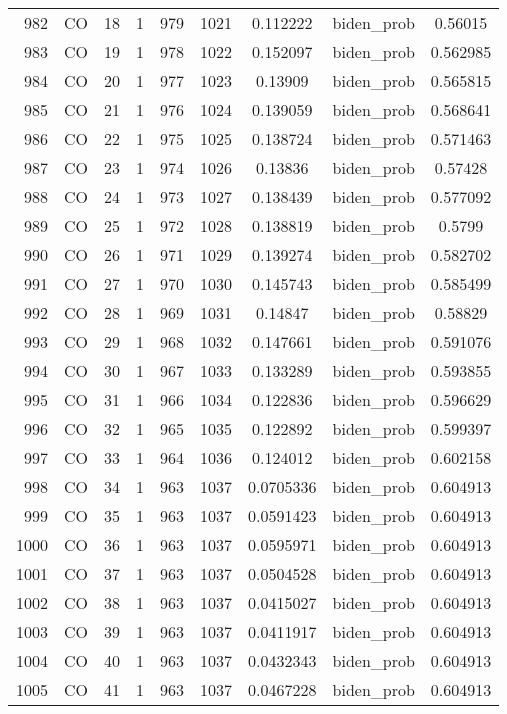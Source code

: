 \documentclass[12pt,a4paper]{article}
\begin{document}
\begin{tabular}{r|cccccccc}
	982 & CO & 18 & 1 & 979 & 1021 & 0.112222 & biden\_prob & 0.56015 \\
	983 & CO & 19 & 1 & 978 & 1022 & 0.152097 & biden\_prob & 0.562985 \\
	984 & CO & 20 & 1 & 977 & 1023 & 0.13909 & biden\_prob & 0.565815 \\
	985 & CO & 21 & 1 & 976 & 1024 & 0.139059 & biden\_prob & 0.568641 \\
	986 & CO & 22 & 1 & 975 & 1025 & 0.138724 & biden\_prob & 0.571463 \\
	987 & CO & 23 & 1 & 974 & 1026 & 0.13836 & biden\_prob & 0.57428 \\
	988 & CO & 24 & 1 & 973 & 1027 & 0.138439 & biden\_prob & 0.577092 \\
	989 & CO & 25 & 1 & 972 & 1028 & 0.138819 & biden\_prob & 0.5799 \\
	990 & CO & 26 & 1 & 971 & 1029 & 0.139274 & biden\_prob & 0.582702 \\
	991 & CO & 27 & 1 & 970 & 1030 & 0.145743 & biden\_prob & 0.585499 \\
	992 & CO & 28 & 1 & 969 & 1031 & 0.14847 & biden\_prob & 0.58829 \\
	993 & CO & 29 & 1 & 968 & 1032 & 0.147661 & biden\_prob & 0.591076 \\
	994 & CO & 30 & 1 & 967 & 1033 & 0.133289 & biden\_prob & 0.593855 \\
	995 & CO & 31 & 1 & 966 & 1034 & 0.122836 & biden\_prob & 0.596629 \\
	996 & CO & 32 & 1 & 965 & 1035 & 0.122892 & biden\_prob & 0.599397 \\
	997 & CO & 33 & 1 & 964 & 1036 & 0.124012 & biden\_prob & 0.602158 \\
	998 & CO & 34 & 1 & 963 & 1037 & 0.0705336 & biden\_prob & 0.604913 \\
	999 & CO & 35 & 1 & 963 & 1037 & 0.0591423 & biden\_prob & 0.604913 \\
	1000 & CO & 36 & 1 & 963 & 1037 & 0.0595971 & biden\_prob & 0.604913 \\
	1001 & CO & 37 & 1 & 963 & 1037 & 0.0504528 & biden\_prob & 0.604913 \\
	1002 & CO & 38 & 1 & 963 & 1037 & 0.0415027 & biden\_prob & 0.604913 \\
	1003 & CO & 39 & 1 & 963 & 1037 & 0.0411917 & biden\_prob & 0.604913 \\
	1004 & CO & 40 & 1 & 963 & 1037 & 0.0432343 & biden\_prob & 0.604913 \\
	1005 & CO & 41 & 1 & 963 & 1037 & 0.0467228 & biden\_prob & 0.604913 \\

\end{tabular}
\end{document}
